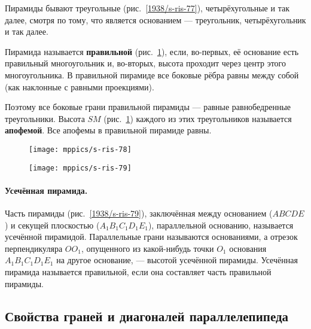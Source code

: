 Пирамиды бывают треугольные (рис.~\ref{1938/s-ris-77}), четырёхугольные и так далее, смотря по тому, что является основанием — треугольник, четырёхугольник и так далее.

Пирамида называется \textbf{правильной} (рис.~\ref{1938/s-ris-78}), если, во-первых, её основание есть правильный многоугольник и, во-вторых, высота проходит через центр этого многоугольника.
В правильной пирамиде все боковые рёбра равны между собой (как наклонные с равными проекциями).

Поэтому все боковые грани правильной пирамиды — равные равнобедренные треугольники.
Высота $SM$ (рис.~\ref{1938/s-ris-78}) каждого из этих треугольников называется \textbf{апофемой}.
Все апофемы в правильной пирамиде равны.

\begin{figure}[h!]
\begin{minipage}{.48\textwidth}
\centering
\texttt{[image: mppics/s-ris-78]}
\end{minipage}
\hfill
\begin{minipage}{.48\textwidth}
\centering
\texttt{[image: mppics/s-ris-79]}
\end{minipage}

\medskip

\begin{minipage}{.48\textwidth}
\centering
\caption{}\label{1938/s-ris-78}
\end{minipage}
\hfill
\begin{minipage}{.48\textwidth}
\centering
\caption{}\label{1938/s-ris-78}
\end{minipage}
\vskip-4mm
\end{figure}

\paragraph{Усечённая пирамида.}\label{1938/s71}
Часть пирамиды (рис.~\ref{1938/s-ris-79}), заключённая между основанием ($ABCDE$) и секущей плоскостью ($A_1B_1C_1D_1E_1$), параллельной основанию, называется усечённой пирамидой.
Параллельные грани называются основаниями, а отрезок перпендикуляра $OO_1$, опущенного из какой-нибудь точки $O_1$ основания $A_1B_1C_1D_1E_1$ на другое основание, — высотой усечённой пирамиды.
Усечённая пирамида называется правильной, если она составляет часть правильной пирамиды.


\subsection*{Свойства граней и диагоналей параллелепипеда}


